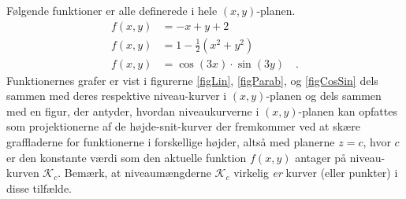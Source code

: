 \begin{example}
Følgende funktioner er alle definerede i hele $(x,y)$-planen.
\begin{equation}
\begin{aligned}
f(x,y) &= -x + y + 2 \\
f(x,y) &= 1- \frac{1}{2}\left(x^{2} + y^{2} \right) \\
f(x,y) &= \cos(3x)\cdot\sin(3y) \quad .
\end{aligned}
\end{equation}
Funktionernes grafer er vist i figurerne \ref{figLin}, \ref{figParab}, og \ref{figCosSin} dels sammen med deres respektive niveau-kurver i $(x,y)$-planen og dels sammen med en figur, der antyder, hvordan niveaukurverne i $(x,y)$-planen kan opfattes som projektionerne af de højde-snit-kurver der fremkommer ved at skære graffladerne for funktionerne i forskellige højder, altså med planerne $z = c$, hvor $c$ er den konstante værdi som den aktuelle funktion $f(x, y)$ antager på niveau-kurven $\mathcal{K}_{c}$. Bemærk, at niveaumængderne $\mathcal{K}_{c}$ virkelig \emph{er} kurver (eller punkter) i disse tilfælde.
\end{example}

